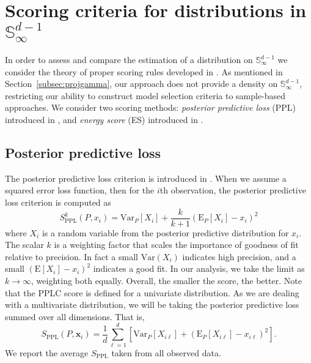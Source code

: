 \section{Scoring criteria for distributions in ${\mathbb S}_\infty^{d-1}$\label{sec:evaluation}}

In order to assess and compare the estimation of a distribution on ${\mathbb S}_\infty^{d-1}$ we consider the theory of proper scoring rules developed in \cite{gneiting2007}.
As mentioned in Section~\ref{subsec:projgamma}, our approach does not provide a density on ${\mathbb S}_{\infty}^{d-1}$, restricting our ability to construct model selection criteria to sample-based approaches.  We consider two scoring methods:  \emph{posterior predictive loss} (PPL) introduced in \cite{gelfand1998}, and \emph{energy score} (ES) introduced in \cite{gneiting2007}.

\subsection{Posterior predictive loss}
The posterior predictive loss criterion is introduced in \cite{gelfand1998}.  When we
  assume a squared error loss function, then for the $i$th observation, the posterior predictive
  loss criterion is computed as
  \begin{equation}
    \label{eq:ppl}
      S_{\text{PPL}}^k\left(P,x_i\right) = \text{Var}_P\left[X_i\right] + \frac{k}{k+1}\left(\text{E}_P\left[X_{i}\right] - x_i\right)^2
  \end{equation}
  where $X_i$ is a random variable from the posterior predictive distribution for $x_i$.  The
  scalar $k$ is a weighting factor that scales the importance of goodness of fit
  relative to precision.  In fact a small $\text{Var}(X_{i})$ indicates high
  precision, and a small $(\text{E}[X_{i}] - x_{i})^2$  indicates a good fit.  In our analysis,
  we take the limit as $k\to\infty$, weighting both
  equally. Overall, the smaller the score, the better.  Note that the PPLC score is defined 
  for a univariate distribution.  As we are dealing
  with a multivariate distribution, we will be taking the posterior predictive loss
  summed over all dimensions.  That is,
  \begin{equation}
    \label{eq:ppl2}
      S_{\text{PPL}}\left(P,\bm{x}_i\right) = \frac{1}{d}\sum_{\ell = 1}^d\left[\text{Var}_P\left[X_{i\ell}\right] + \left(\text{E}_P\left[X_{i\ell}\right] - x_{i\ell}\right)^2\right] .
  \end{equation}
  We report the average $S_{\text{PPL}}$ taken from all observed data.

